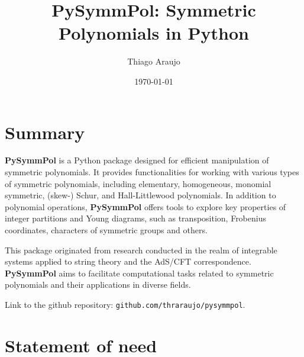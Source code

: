 \documentclass[a4paper,10pt]{amsart}
\begin{document}
\title[PySymmPol]{PySymmPol: Symmetric Polynomials in Python}

\author{Thiago Araujo}

\address{\noindent 
Institute for Theoretical Physics, UNESP-Universidade Estadual Paulista
R. Dr. Bento T. Ferraz 271, Bl. II, Sao Paulo 01140-070, SP, Brazil\\
and
Institute of Physics\\
Universidade de S\~ao Paulo\\ 
Rua do Matão Travessa 1371, 05508-090\\
São Paulo, SP. Brazil}


\date{\today}

\maketitle

\setcounter{tocdepth}{1}
\tableofcontents


\section{Summary}

\textbf{PySymmPol}
is a Python package designed for efficient manipulation of
symmetric polynomials. It provides functionalities for working with
various types of symmetric polynomials, including elementary,
homogeneous, monomial symmetric, (skew-) Schur, and Hall-Littlewood
polynomials. In addition to polynomial operations, \textbf{PySymmPol} offers
tools to explore key properties of integer partitions and Young
diagrams, such as transposition, Frobenius coordinates, characters of
symmetric groups and others. 

This package originated from research conducted in the realm of
integrable systems applied to string theory and the AdS/CFT
correspondence. \textbf{PySymmPol} aims to facilitate computational tasks
related to symmetric polynomials and their applications in diverse
fields.

Link to the github repository: \texttt{github.com/thraraujo/pysymmpol}.

\section{Statement of need}
\end{document}
